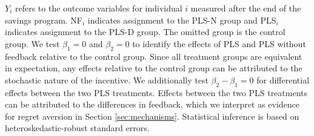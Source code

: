 \documentclass[12pt]{article}
\begin{document}
		$Y_{i}$ refers to the outcome variables for individual $i$ measured after the end of the savings program. NF$_i$ indicates assignment to the PLS-N group and PLS$_i$ indicates assignment to the PLS-D group. The omitted group is the control group. We test $\beta_{1} = 0$ and $\beta_{2} = 0$ to identify the effects of PLS and PLS without feedback relative to the control group. Since all treatment groups are equivalent in expectation, any effects relative to the control group can be attributed to the stochastic nature of the incentive. We additionally test $\beta_{2} - \beta_{1} = 0$ for differential effects between the two PLS treatments. Effects between the two PLS treatments can be attributed to the differences in feedback, which we interpret as evidence for regret aversion in Section \ref{sec:mechanisms}. Statistical inference is based on heteroskedastic-robust standard errors.



\end{document}
